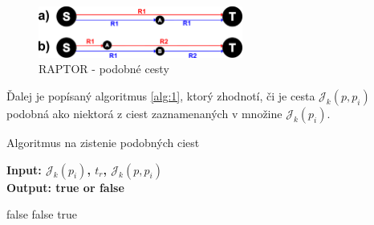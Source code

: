 \begin{figure}[H]
\centerline{\includegraphics[width=0.6\textwidth]{images/similar-paths}}
\caption[RAPTOR - podobné cesty]{RAPTOR - podobné cesty}
\label{fig:similar-paths}
\end{figure}

Ďalej je popísaný algoritmus \ref{alg:1}, ktorý zhodnotí, či je cesta $\mathcal{J}_k(p, p_i)$ podobná ako niektorá z ciest zaznamenaných v množine $\mathcal{J}_k(p_i)$.

\begin{algorithm}
\caption{Algoritmus na zistenie podobných ciest}\label{alg:1}
 \hspace*{\algorithmicindent} \textbf{Input: $\mathcal{J}_k(p_i)$, $t_r$, $\mathcal{J}_k(p, p_i)$} \\
 \hspace*{\algorithmicindent} \textbf{Output: true or false} 
\begin{algorithmic}[1]
 \Return false
 \Return false
\Else {} \Return true
\EndIf
\EndFor
\end{algorithmic}
\end{algorithm}

